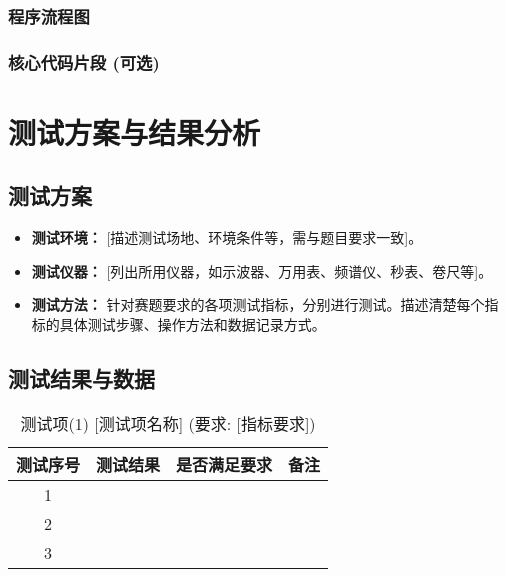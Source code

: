 \documentclass[UTF-8,zihao=-4]{ctexart}
\begin{document}
\subsubsection{程序流程图}
    
\subsubsection{核心代码片段 (可选)}

\section{测试方案与结果分析}
\subsection{测试方案}
    \begin{itemize}
        \item \textbf{测试环境：} [描述测试场地、环境条件等，需与题目要求一致]。
        \item \textbf{测试仪器：} [列出所用仪器，如示波器、万用表、频谱仪、秒表、卷尺等]。
        \item \textbf{测试方法：} 针对赛题要求的各项测试指标，分别进行测试。描述清楚每个指标的具体测试步骤、操作方法和数据记录方式。
    \end{itemize}

\subsection{测试结果与数据}
    \begin{table}[H]
        \centering
        \caption{测试项(1) [测试项名称] (要求: [指标要求])}
        \label{tab:task1}
        \begin{tabular}{cccc}
            \toprule
            测试序号 & 测试结果 & 是否满足要求 & 备注 \\
            \midrule
            1 & & & \\
            2 & & & \\
            3 & & & \\
            \bottomrule
        \end{tabular}
    \end{table}
\end{document}

